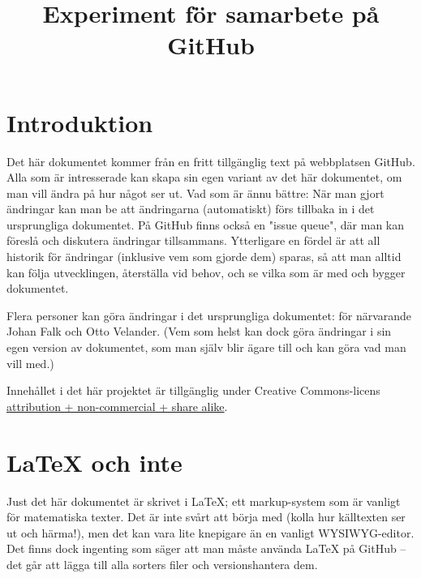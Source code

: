 \documentclass[12pt]{article}
\title{Experiment för samarbete på GitHub}
\date{}
\begin{document}
  \maketitle
  
  \section{Introduktion}
  Det här dokumentet kommer från en fritt tillgänglig text på webbplatsen GitHub.
  Alla som är intresserade kan skapa sin egen variant av det här dokumentet, om man vill ändra på hur något ser ut.
  Vad som är ännu bättre: När man gjort ändringar kan man be att ändringarna (automatiskt) förs tillbaka in i det ursprungliga dokumentet.
  På GitHub finns också en "issue queue", där man kan föreslå och diskutera ändringar tillsammans.
  Ytterligare en fördel är att all historik för ändringar (inklusive vem som gjorde dem) sparas, så att man alltid kan följa utvecklingen, återställa vid behov, och se vilka som är med och bygger dokumentet.
  
  Flera personer kan göra ändringar i det ursprungliga dokumentet: för närvarande Johan Falk och Otto Velander.
  (Vem som helst kan dock göra ändringar i sin egen version av dokumentet, som man själv blir ägare till och kan göra vad man vill med.)
  
  Innehållet i det här projektet är tillgänglig under Creative Commons-licens \href{http://creativecommons.org/licenses/by-nc-sa/3.0/}{attribution + non-commercial + share alike}.

  \section{LaTeX och inte}
  Just det här dokumentet är skrivet i LaTeX; ett markup-system som är vanligt för matematiska texter.
  Det är inte svårt att börja med (kolla hur källtexten ser ut och härma!), men det kan vara lite knepigare än en vanligt WYSIWYG-editor.
  Det finns dock ingenting som säger att man måste använda LaTeX på GitHub -- det går att lägga till alla sorters filer och versionshantera dem.

  
  
\end{document}
